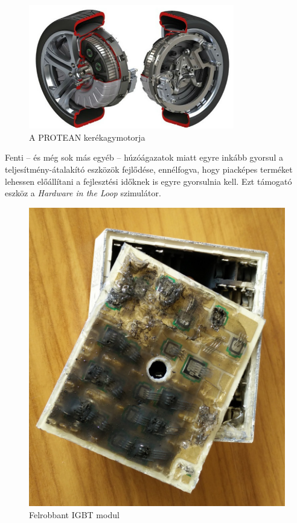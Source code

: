 \begin{figure}[h]
	\centering
	\includegraphics[width = 0.8\textwidth]{figures/protean_motor.jpg}
	\caption{A PROTEAN kerékagymotorja} 
	\label{fig:protean}
\end{figure}

Fenti -- és még sok más egyéb -- húzóágazatok miatt egyre inkább gyorsul a teljesítmény-átalakító eszközök fejlődése, ennélfogva, hogy piacképes terméket lehessen előállítani a fejlesztési időknek is egyre gyorsulnia kell. Ezt támogató eszköz a \emph{Hardware in the Loop} szimulátor. 


\begin{figure}[h]
	\centering
	\includegraphics[scale = 0.1]{figures/IMG_20160415_134241.jpg}
	\caption{Felrobbant IGBT modul} 
	\label{fig:blown}
\end{figure}

